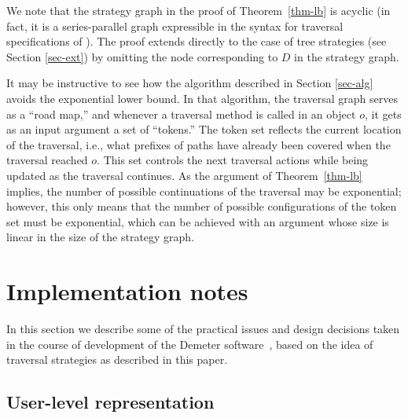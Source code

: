 We note that the strategy graph in the proof of Theorem~\ref{thm-lb}
is acyclic (in fact, it is a series-parallel graph expressible in the
syntax for traversal specifications of
\cite{gener-comp-j:jens-boaz-karl}).  The proof extends directly to
the case of tree strategies (see Section
\ref{sec-ext}) by omitting the node corresponding to $D$ in the strategy
graph.

It may be instructive to see how the algorithm described in Section
\ref{sec-alg} avoids the exponential lower bound. In that algorithm,
the traversal graph serves as a ``road map,'' and whenever a traversal
method is called in an object $o$, it gets as an input argument a set
of ``tokens.''  The token set reflects the current location of the
traversal, i.e., what prefixes of paths have already been covered when
the traversal reached $o$.  This set controls the next traversal
actions while being updated as the traversal continues.  As the
argument of Theorem~\ref{thm-lb} implies, the number of possible
continuations of the traversal may be exponential; however, this only
means that the number of possible configurations of the token set must
be exponential, which can be achieved with an argument whose size is
linear in the size of the strategy graph.

\section{Implementation notes}
\label{sec-notes}

In this section we describe some of the practical issues and design
decisions taken in the course of development of the Demeter
software~\cite{URL:demeter}, based on the idea of traversal strategies
as described in this paper.

\subsection{User-level representation}
\label{ssec-syntax}

